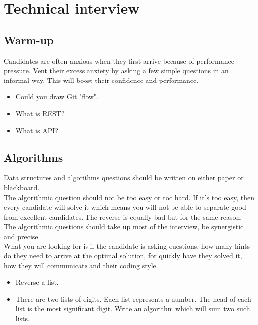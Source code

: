 \documentclass{article}
\begin{document}
\section{Technical interview}


\subsection{Warm-up}

Candidates are often anxious when they first arrive because of performance pressure. Vent their excess anxiety by asking a few simple questions in an informal way. This will boost their confidence and performance.

\begin{itemize}
    \item Could you draw Git "flow".
    \item What is REST?
    \item What is API?
\end{itemize}


\subsection{Algorithms} 

Data structures and algorithms questions should be written on either paper or blackboard. \\
The algorithmic question should not be too easy or too hard. If it's too easy, then every candidate will solve it which means you will not be able to separate good from excellent candidates. The reverse is equally bad but for the same reason. \\
The algorithmic questions should take up most of the interview, be synergistic and precise. \\
What you are looking for is if the candidate is asking questions, how many hints do they need to arrive at the optimal solution, for quickly have they solved it, how they will communicate and their coding style.

\begin{itemize}
    \item Reverse a list.
    \item There are two lists of digits. Each list represents a number. The head of each list is the most significant digit. Write an algorithm which will sum two such lists.
\end{itemize}
\end{document}
